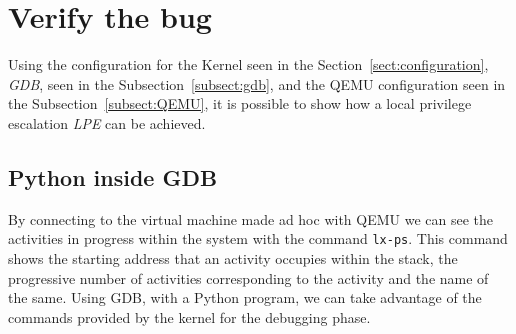 \documentclass{masterthesis}
\newcommand{\refToSection}[1]{Section~\ref{sect:#1}\xspace}
\newcommand{\refToSubSection}[1]{Subsection~\ref{subsect:#1}\xspace}
\begin{document}
\section{Verify the bug}
\label{sect:bug}
Using the configuration for the Kernel seen in the \refToSection{configuration}, \emph{GDB}, seen in the \refToSubSection{gdb}, and the QEMU configuration seen in the \refToSubSection{QEMU}, it is possible to show how a local privilege escalation \emph{LPE} can be achieved.
\subsection{Python inside GDB}
\label{subsect:py_gdb}

By connecting to the virtual machine made ad hoc with QEMU we can see the activities in progress within the system with the command \texttt{lx-ps}.
This command shows the starting address that an activity occupies within the stack, the progressive number of activities corresponding to the activity and the name of the same.
Using GDB, with a Python program, we can take advantage of the commands provided by the kernel for the debugging phase.
\end{document}
